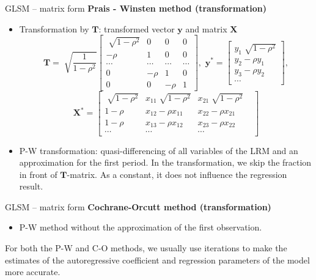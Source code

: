 \documentclass{beamer}
\begin{document}

\begin{frame}{GLSM – matrix form}
\textbf{Prais - Winsten method (transformation)}
\begin{itemize}
\item Transformation by $\boldsymbol{T}$: transformed vector $\boldsymbol{y}$ and matrix $\boldsymbol{X}$
$$\boldsymbol{T}=\sqrt[]{\frac{1}{1-\rho^2}}
\begin{bmatrix}
 \sqrt[]{1-\rho^2}&  0 & 0 & 0\\
 - \rho &  1&  0 & 0\\ 
 \cdots & \cdots & \cdots & \cdots \\
0 &  -\rho &  1& 0\\ 
0 & 0 & -\rho &1 
\end{bmatrix}, \,\,
\boldsymbol{y^\ast}=
\begin{bmatrix}
y_1\sqrt[]{1-\rho^2}\\
y_2-\rho y_1\\
y_3-\rho y_2 \\
\cdots
\end{bmatrix},
$$ $$
\boldsymbol{X^\ast}=\begin{bmatrix}
\sqrt[]{1-\rho^2} & x_{11}\sqrt[]{1-\rho^2} & x_{21}\sqrt[]{1-\rho^2}\\
1-\rho & x_{12}-\rho x_{11} & x_{22}-\rho x_{21} \\
1-\rho & x_{13}-\rho x_{12} & x_{23}-\rho x_{22} \\
\cdots & \cdots & \cdots &
\end{bmatrix}
$$

\item P-W  transformation: quasi-differencing of all variables of the LRM and an approximation for the first period. In the transformation, we skip the fraction in front of $\boldsymbol{T}$-matrix. As a constant, it does not influence the regression result.

\end{itemize}
\end{frame}


\begin{frame}{GLSM – matrix form}
\textbf{Cochrane-Orcutt method (transformation)}
\begin{itemize}
\item P-W method without the approximation of the first observation.
\end{itemize}

\vspace{1cm}

For both the P-W and C-O methods, we usually use iterations to make the estimates of the autoregressive coefficient and regression parameters of the model more accurate.

\end{frame}
\end{document}
